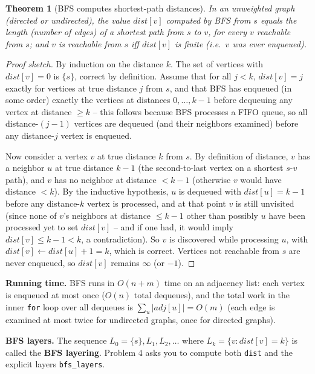 \documentclass[11pt]{article}
\newtheorem{theorem}{Theorem}[section]
\begin{document}
\begin{theorem}[BFS computes shortest-path distances]
\label{thm:bfs-correct}
In an unweighted graph (directed or undirected), the value $dist[v]$ computed by BFS from
$s$ equals the length (number of edges) of a shortest path from $s$ to $v$, for every $v$
reachable from $s$; and $v$ is reachable from $s$ iff $dist[v]$ is finite (i.e.\ $v$ was
ever enqueued).
\end{theorem}
\begin{proof}[Proof sketch]
By induction on the distance $k$. The set of vertices with $dist[v] = 0$ is $\{s\}$,
correct by definition. Assume that for all $j < k$, $dist[v] = j$ exactly for vertices at
true distance $j$ from $s$, and that BFS has enqueued (in some order) exactly the
vertices at distances $0, \dots, k-1$ before dequeuing any vertex at distance $\ge k$ --
this follows because BFS processes a FIFO queue, so all distance-$(j-1)$ vertices are
dequeued (and their neighbors examined) before any distance-$j$ vertex is enqueued.

Now consider a vertex $v$ at true distance $k$ from $s$. By definition of distance, $v$
has a neighbor $u$ at true distance $k-1$ (the second-to-last vertex on a shortest
$s$-$v$ path), and $v$ has no neighbor at distance $< k-1$ (otherwise $v$ would have
distance $< k$). By the inductive hypothesis, $u$ is dequeued with $dist[u] = k-1$
before any distance-$k$ vertex is processed, and at that point $v$ is still unvisited
(since none of $v$'s neighbors at distance $\le k-1$ other than possibly $u$ have been
processed yet to set $dist[v]$ -- and if one had, it would imply $dist[v] \le k-1 <
k$, a contradiction). So $v$ is discovered while processing $u$, with $dist[v] \gets
dist[u]+1 = k$, which is correct. Vertices not reachable from $s$ are never enqueued, so
$dist[v]$ remains $\infty$ (or $-1$).
\end{proof}

\textbf{Running time.} BFS runs in $O(n + m)$ time on an adjacency list: each vertex is
enqueued at most once ($O(n)$ total dequeues), and the total work in the inner \texttt{for}
loop over all dequeues is $\sum_u |adj[u]| = O(m)$ (each edge is examined at most twice
for undirected graphs, once for directed graphs).

\textbf{BFS layers.} The sequence $L_0 = \{s\}, L_1, L_2, \dots$ where $L_k = \{v :
dist[v] = k\}$ is called the \textbf{BFS layering}. Problem 4 asks you to compute both
\texttt{dist} and the explicit layers \texttt{bfs\_layers}.
\end{document}
